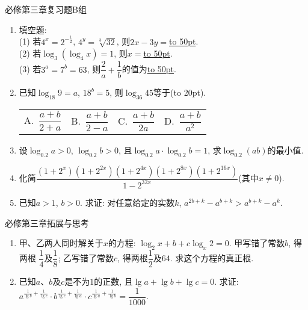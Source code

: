 \documentclass[10pt,a4paper]{article}
\newcommand{\blank}[1]{\underline{\hbox to #1pt{}}}
\newcommand{\bracket}[1]{(\hbox to #1pt{})}
\newcommand{\fourch}[4]{\par\begin{tabular}{p{.23\textwidth}p{.23\textwidth}p{.23\textwidth}p{.23\textwidth}}
A.~#1 &B.~#2& C.~#3& D.~#4
\end{tabular}}
\begin{document}
必修第三章复习题B组
\begin{enumerate}[1.]

\item 填空题:\\
(1) 若$4^x=2^{-\frac{1}{2}}$, $4^y=\sqrt[3]{32}$, 则$2x-3y=$\blank{50}.\\
(2) 若$\log_3(\log_4 x)=1$, 则$x=$\blank{50}.\\
(3) 若$3^a=7^b=63$, 则$\dfrac 2a+\dfrac 1b$的值为\blank{50}.\\
\vspace*{3cm}
\item 已知$\log_{18}9=a$, $18^b=5$, 则$\log_{36}45$等于\bracket{20}.
\fourch{$\dfrac{a+b}{2+a}$}{$\dfrac{a+b}{2-a}$}{$\dfrac{a+b}{2a}$}{$\dfrac{a+b}{a^2}$}
\vspace*{3cm}
\item 设$\log_{0.2}a>0$, $\log_{0.2}b>0$, 且$\log_{0.2}a\cdot \log_{0.2}b=1$, 求$\log_{0.2}(ab)$的最小值.
\vspace*{3cm}
\item 化简$\dfrac{(1+2^x)(1+2^{2x})(1+2^{4x})(1+2^{8x})(1+2^{16x})}{1-2^{32x}}$(其中$x\ne 0$).
\vspace*{3cm}
\item 已知$a>1$, $b>0$. 求证: 对任意给定的实数$k$, $a^{2b+k}-a^{b+k}>a^{b+k}-a^k$.
\vspace*{3cm}
\end{enumerate}

必修第三章拓展与思考
\begin{enumerate}[1.]

\item 甲、乙两人同时解关于$x$的方程: $\log_2x+b+c\log_x2=0$. 甲写错了常数$b$, 得两根
$\dfrac 14$及$\dfrac 18$; 乙写错了常数$c$, 得两根$\dfrac 12$及$64$. 求这个方程的真正根.
\vspace*{3cm}
\item 已知$a$、$b$及$c$是不为$1$的正数, 且$\lg a+\lg b+\lg c=0$. 求证: $a^{\frac{1}{\lg b}+\frac{1}{\lg c}}\cdot b^{\frac{1}{\lg c}+\frac{1}{\lg a}}\cdot c^{\frac{1}{\lg a}+\frac{1}{\lg b}}=\dfrac{1}{1000}$.
\vspace*{3cm}
\end{enumerate}
\end{document}

